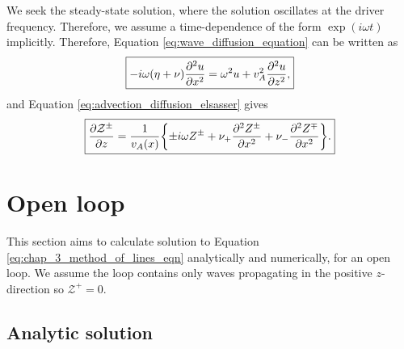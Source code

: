 We seek the steady-state solution, where the solution oscillates at the driver frequency. Therefore, we assume a time-dependence of the form $\exp(i\omega t)$ implicitly. Therefore,
Equation \eqref{eq:wave_diffusion_equation} can be written as
\begin{equation}
    \label{eq:method_of_lines_eqn_u}
    \boxed{-i\omega(\eta+\nu)\pdv[2]{u}{x} = \omega^2u + v_A^2\pdv[2]{u}{z},}
\end{equation}
and Equation \eqref{eq:advection_diffusion_elsasser} gives
\begin{equation}
    \label{eq:chap_3_method_of_lines_eqn}
     \boxed{\pdv{\mathcal{Z}^\pm}{z} = \frac{1}{v_A(x)}\qty{\pm i\omega Z^{\pm} + \nu_+ \pdv[2]{Z^\pm}{x} + \nu_-\pdv[2]{Z^\mp}{x}}.}
\end{equation}

\section{Open loop}
\label{sec:chap_3_open_loop}

This section aims to calculate solution to Equation \eqref{eq:chap_3_method_of_lines_eqn} analytically and numerically, for an open loop. We assume the loop contains only waves propagating in the positive $z$-direction so $\mathcal{Z}^+=0$.

\subsection{Analytic solution}

